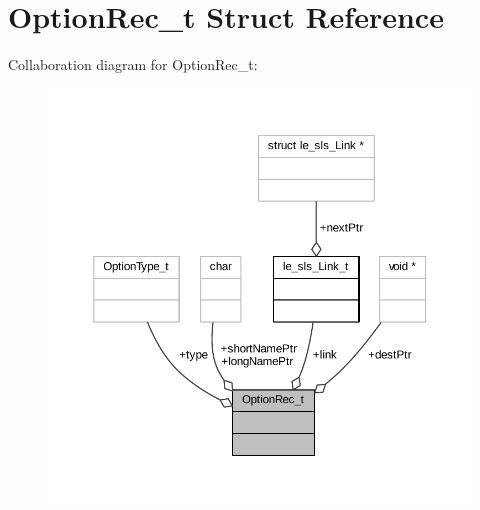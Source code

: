 \hypertarget{struct_option_rec__t}{}\section{Option\+Rec\+\_\+t Struct Reference}
\label{struct_option_rec__t}


Collaboration diagram for Option\+Rec\+\_\+t\+:
\nopagebreak
\begin{figure}[H]
\begin{center}
\leavevmode
\includegraphics[width=350pt]{struct_option_rec__t__coll__graph}
\end{center}
\end{figure}
